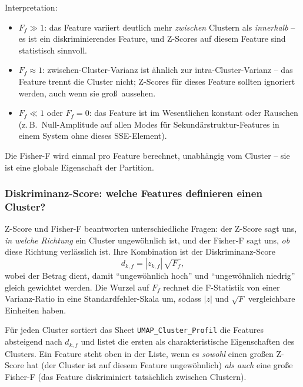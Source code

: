 \documentclass[11pt,a4paper,twoside]{article}
\theoremstyle{remark}
\begin{document}
Interpretation:
\begin{itemize}\setlength{\itemsep}{0pt}
  \item $F_f \gg 1$: das Feature variiert deutlich mehr
        \emph{zwischen} Clustern als \emph{innerhalb} -- es ist
        ein diskriminierendes Feature, und Z-Scores auf diesem
        Feature sind statistisch sinnvoll.
  \item $F_f \approx 1$: zwischen-Cluster-Varianz ist \"ahnlich
        zur intra-Cluster-Varianz -- das Feature trennt die
        Cluster nicht; Z-Scores f\"ur dieses Feature sollten
        ignoriert werden, auch wenn sie gro\ss\ aussehen.
  \item $F_f \ll 1$ oder $F_f = 0$: das Feature ist im Wesentlichen
        konstant oder Rauschen (z.\,B.\ Null-Amplitude auf allen
        Modes f\"ur Sekund\"arstruktur-Features in einem System
        ohne dieses SSE-Element).
\end{itemize}

Die Fisher-F wird einmal pro Feature berechnet, unabh\"angig vom
Cluster -- sie ist eine globale Eigenschaft der Partition.

\subsubsection*{Diskriminanz-Score: welche Features definieren einen Cluster?}

Z-Score und Fisher-F beantworten unterschiedliche Fragen: der
Z-Score sagt uns, \emph{in welche Richtung} ein Cluster
ungew\"ohnlich ist, und der Fisher-F sagt uns, \emph{ob} diese
Richtung verl\"asslich ist. Ihre Kombination ist der
Diskriminanz-Score
\begin{equation}
  d_{k,f} = |z_{k,f}|\,\sqrt{F_f},
  \label{eq:discriminant}
\end{equation}
wobei der Betrag dient, damit ``ungew\"ohnlich hoch'' und
``ungew\"ohnlich niedrig'' gleich gewichtet werden. Die Wurzel auf
$F_f$ rechnet die F-Statistik von einer Varianz-Ratio in eine
Standardfehler-Skala um, sodass $|z|$ und $\sqrt{F}$ vergleichbare
Einheiten haben.

F\"ur jeden Cluster sortiert das Sheet \texttt{UMAP\_Cluster\_Profil}
die Features absteigend nach $d_{k,f}$ und listet die ersten als
charakteristische Eigenschaften des Clusters. Ein Feature steht
oben in der Liste, wenn es \emph{sowohl} einen gro\ss en Z-Score
hat (der Cluster ist auf diesem Feature ungew\"ohnlich) \emph{als
auch} eine gro\ss e Fisher-F (das Feature diskriminiert
tats\"achlich zwischen Clustern).
\end{document}
